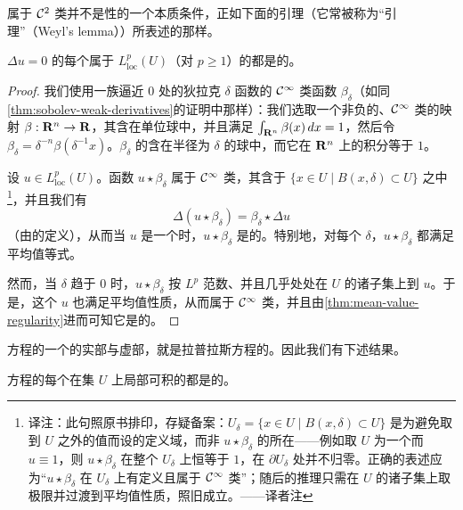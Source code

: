 属于 $\mathcal{C}^{2}$ 类并不是\trHarmonic{}性的一个本质条件，正如下面的引理（它常被称为“\trWeyl{}引理”（Weyl's lemma））所表述的那样。

\begin{lemma}\label{thm:weyl-lemma}
$\Delta u=0$ 的每个属于 $L^{p}_{\mathrm{loc}}(U)$（对 $p\ge1$）的\trWeakSolution{}都是\trHarmonic{}的。
\end{lemma}

\begin{proof}
我们使用一族逼近 $0$ 处的狄拉克 $\delta$ 函数的 $\mathcal{C}^{\infty}$ 类函数 $\beta_{\delta}$（如同\cref{thm:sobolev-weak-derivatives}的证明中那样）：我们选取一个非负的、$\mathcal{C}^{\infty}$ 类的映射 $\beta:\mathbf{R}^{n}\to\mathbf{R}$，其\trSupport{}含在单位球中，并且满足 $\int_{\mathbf{R}^{n}}\beta(x)\,dx=1$，然后令 $\beta_{\delta}=\delta^{-n}\beta(\delta^{-1}x)$。$\beta_{\delta}$ 的\trSupport{}含在半径为 $\delta$ 的球中，而它在 $\mathbf{R}^{n}$ 上的积分等于 $1$。

设 $u\in L^{p}_{\mathrm{loc}}(U)$。函数 $u\star\beta_{\delta}$ 属于 $\mathcal{C}^{\infty}$ 类，其\trSupport{}含于 $\{x\in U\mid B(x,\delta)\subset U\}$ 之中\footnote{译注：此句照原书排印，存疑备案：$U_{\delta}=\{x\in U\mid B(x,\delta)\subset U\}$ 是为避免取到 $U$ 之外的值而设的\trConvolution{}定义域，而非 $u\star\beta_{\delta}$ 的\trSupport{}所在——例如取 $U$ 为一个\trDisk{}而 $u\equiv1$，则 $u\star\beta_{\delta}$ 在整个 $U_{\delta}$ 上恒等于 $1$，在 $\partial U_{\delta}$ 处并不归零。正确的表述应为“$u\star\beta_{\delta}$ 在 $U_{\delta}$ 上有定义且属于 $\mathcal{C}^{\infty}$ 类”；随后的推理只需在 $U$ 的诸\trCompact{}子集上取极限并过渡到平均值性质，照旧成立。——译者注}，并且我们有
\[
\Delta(u\star\beta_{\delta})=\beta_{\delta}\star\Delta u
\]
（由\trWeakDerivative{}的定义），从而当 $u$ 是一个\trWeakSolution{}时，$u\star\beta_{\delta}$ 是\trHarmonic{}的。特别地，对每个 $\delta$，\trConvolution $u\star\beta_{\delta}$ 都满足平均值等式。

然而，当 $\delta$ 趋于 $0$ 时，$u\star\beta_{\delta}$ 按 $L^{p}$ 范数、并且几乎处处在 $U$ 的诸\trCompact{}子集上\trConvergence{}到 $u$。于是，这个\trWeakSolution{} $u$ 也满足平均值性质，从而属于 $\mathcal{C}^{\infty}$ 类，并且由\cref{thm:mean-value-regularity}进而可知它是\trHarmonic{}的。
\end{proof}

\trCauchyRiemann{}方程的一个\trWeakSolution{}的实部与虚部，就是拉普拉斯方程的\trWeakSolution。因此我们有下述结果。

\begin{lemma}\label{thm:weak-cr-holomorphic}
\trCauchyRiemann{}方程的每个在\trOpen{}集 $U$ 上局部可积的\trWeakSolution{}都是\trHolomorphic{}的。
\end{lemma}

